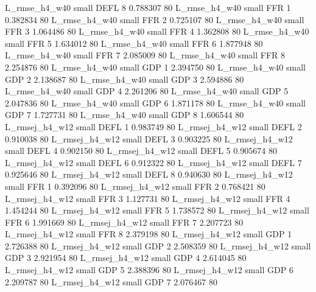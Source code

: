  L_rmse_h4_w40      small     DEFL                 8 0.788307 80
 L_rmse_h4_w40      small      FFR                 1 0.382834 80
 L_rmse_h4_w40      small      FFR                 2 0.725107 80
 L_rmse_h4_w40      small      FFR                 3 1.064486 80
 L_rmse_h4_w40      small      FFR                 4 1.362808 80
 L_rmse_h4_w40      small      FFR                 5 1.634012 80
 L_rmse_h4_w40      small      FFR                 6 1.877948 80
 L_rmse_h4_w40      small      FFR                 7 2.085009 80
 L_rmse_h4_w40      small      FFR                 8 2.254876 80
 L_rmse_h4_w40      small      GDP                 1 2.394750 80
 L_rmse_h4_w40      small      GDP                 2 2.138687 80
 L_rmse_h4_w40      small      GDP                 3 2.594886 80
 L_rmse_h4_w40      small      GDP                 4 2.261206 80
 L_rmse_h4_w40      small      GDP                 5 2.047836 80
 L_rmse_h4_w40      small      GDP                 6 1.871178 80
 L_rmse_h4_w40      small      GDP                 7 1.727731 80
 L_rmse_h4_w40      small      GDP                 8 1.606544 80
L_rmsej_h4_w12      small     DEFL                 1 0.983749 80
L_rmsej_h4_w12      small     DEFL                 2 0.910038 80
L_rmsej_h4_w12      small     DEFL                 3 0.903225 80
L_rmsej_h4_w12      small     DEFL                 4 0.902150 80
L_rmsej_h4_w12      small     DEFL                 5 0.905674 80
L_rmsej_h4_w12      small     DEFL                 6 0.912322 80
L_rmsej_h4_w12      small     DEFL                 7 0.925646 80
L_rmsej_h4_w12      small     DEFL                 8 0.940630 80
L_rmsej_h4_w12      small      FFR                 1 0.392096 80
L_rmsej_h4_w12      small      FFR                 2 0.768421 80
L_rmsej_h4_w12      small      FFR                 3 1.127731 80
L_rmsej_h4_w12      small      FFR                 4 1.454244 80
L_rmsej_h4_w12      small      FFR                 5 1.738572 80
L_rmsej_h4_w12      small      FFR                 6 1.991669 80
L_rmsej_h4_w12      small      FFR                 7 2.207723 80
L_rmsej_h4_w12      small      FFR                 8 2.379198 80
L_rmsej_h4_w12      small      GDP                 1 2.726388 80
L_rmsej_h4_w12      small      GDP                 2 2.508359 80
L_rmsej_h4_w12      small      GDP                 3 2.921954 80
L_rmsej_h4_w12      small      GDP                 4 2.614045 80
L_rmsej_h4_w12      small      GDP                 5 2.388396 80
L_rmsej_h4_w12      small      GDP                 6 2.209787 80
L_rmsej_h4_w12      small      GDP                 7 2.076467 80
